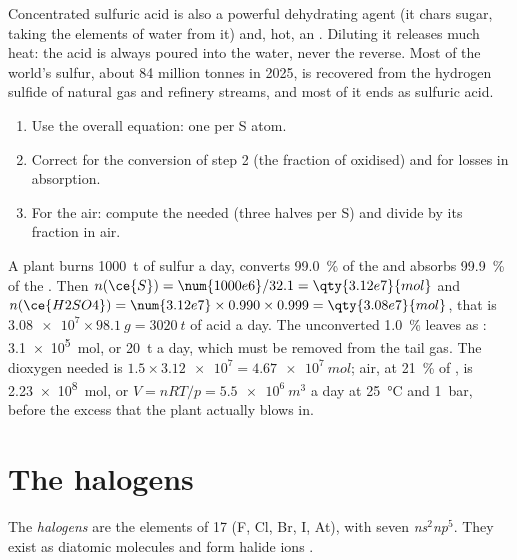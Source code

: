 Concentrated sulfuric acid is also a powerful dehydrating agent (it chars
sugar, taking the elements of water from it) and, hot, an . Diluting
it releases much heat: the acid is always poured into the water, never the
reverse. Most of the world's sulfur, about 84 million tonnes in 2025, is
recovered from the hydrogen sulfide of natural gas and refinery streams,
and most of it ends as sulfuric acid.

\begin{method}\label{met:b1:p-block-16-18:contact-balance}
\begin{enumerate}
  \item Use the overall equation: one  per S atom.
  \item Correct for the conversion of step 2 (the fraction of 
        oxidised) and for losses in absorption.
  \item For the air: compute the  needed (three halves per S) and
        divide by its fraction in air.
\end{enumerate}
\end{method}

\begin{example}
A plant burns \qty{1000}{t} of sulfur a day, converts \qty{99.0}{\percent}
of the  and absorbs \qty{99.9}{\percent} of the . Then
$n(\ce{S}) = \num{1000e6}/32.1 = \qty{3.12e7}{mol}$ and
$n(\ce{H2SO4}) = \num{3.12e7} \times 0.990 \times 0.999
= \qty{3.08e7}{mol}$, that is $\num{3.08e7} \times \qty{98.1}{g}
= \qty{3020}{t}$ of acid a day. The unconverted \qty{1.0}{\percent} leaves
as : \qty{3.1e5}{mol}, or \qty{20}{t} a day, which must be removed
from the tail gas. The dioxygen needed is $1.5 \times \num{3.12e7} =
\qty{4.67e7}{mol}$; air, at \qty{21}{\percent} of , is
\qty{2.23e8}{mol}, or $V = nRT/p = \qty{5.5e6}{m^3}$ a day at
\qty{25}{\celsius} and \qty{1}{bar}, before the excess that the plant
actually blows in.
\end{example}

\section{The halogens}

\begin{definition}[Halogens]\label{def:b1:p-block-16-18:halogen}
The \emph{halogens} are the elements of  17 (F, Cl,
Br, I, At), with seven  \textit{ns}$^2$\textit{np}$^5$.
They exist as diatomic molecules  and form halide ions .
\end{definition}


